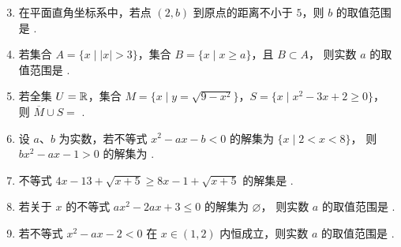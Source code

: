 \documentclass[a4paper,11pt]{article}
\begin{document}


\begin{enumerate}
\setcounter{enumi}{2}

\item 在平面直角坐标系中，若点 $(2,b)$ 到原点的距离不小于 $5$，则 $b$ 的取值范围是 \blankline[4.4em].

\ifanswer
\solbegin
{}
\step{则 $b$ 的取值范围是 $(-\infty,-\sqrt{21}]\cup[\sqrt{21},+\infty)$.}
\solend

\fi

\item 若集合 $A=\{x\mid|x|>3\}$，集合 $B=\{x\mid x\geqslant a\}$，且 $B\subset A$，
则实数 $a$ 的取值范围是 \blankline[4.4em].


\item 若全集 $U=\mathbb{R}$，集合 $M=\{x\mid y=\sqrt{9-x^2}\}$，$S=\{x\mid x^2-3x+2\geqslant0\}$，
则 $\overline{M}\cup S=$ \blankline[4.4em].

\ans{$(-\infty,1]\cup[2,+\infty)$}

\item 设 $a$、$b$ 为实数，若不等式 $x^2-ax-b<0$ 的解集为 $\{x\mid2<x<8\}$，
则 $bx^2-ax-1>0$ 的解集为 \blankline[4.4em].


\item 不等式 $4x-13+\sqrt{x+5}\geqslant8x-1+\sqrt{x+5}$ 的解集是 \blankline[4.4em].

\ans{$[-5,-3]$}

\item 若关于 $x$ 的不等式 $ax^2-2ax+3\leqslant0$ 的解集为 $\varnothing$，
则实数 $a$ 的取值范围是 \blankline[4.4em].

\ans{$[0,3)$}

\item 若不等式 $x^2-ax-2<0$ 在 $x\in(1,2)$ 内恒成立，则实数 $a$ 的取值范围是 \blankline[4.4em].

\ifanswer
\solbegin
{}
\step{所以 $a$ 的取值范围是 $[1,+\infty)$.}
\solend


\end{enumerate}
\end{document}
